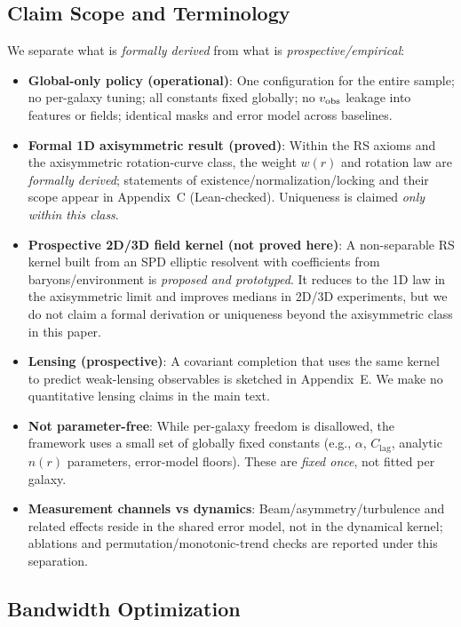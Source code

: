 \documentclass[fleqn,usenatbib]{mnras}
\begin{document}
\subsection*{Claim Scope and Terminology}
\noindent We separate what is \emph{formally derived} from what is \emph{prospective/empirical}:
\begin{itemize}
  \item \textbf{Global-only policy (operational)}: One configuration for the entire sample; no per-galaxy tuning; all constants fixed globally; no $v_{\rm obs}$ leakage into features or fields; identical masks and error model across baselines.
  \item \textbf{Formal 1D axisymmetric result (proved)}: Within the RS axioms and the axisymmetric rotation-curve class, the weight $w(r)$ and rotation law are \emph{formally derived}; statements of existence/normalization/locking and their scope appear in Appendix~C (Lean-checked). Uniqueness is claimed \emph{only within this class}.
  \item \textbf{Prospective 2D/3D field kernel (not proved here)}: A non-separable RS kernel built from an SPD elliptic resolvent with coefficients from baryons/environment is \emph{proposed and prototyped}. It reduces to the 1D law in the axisymmetric limit and improves medians in 2D/3D experiments, but we do not claim a formal derivation or uniqueness beyond the axisymmetric class in this paper.
  \item \textbf{Lensing (prospective)}: A covariant completion that uses the same kernel to predict weak-lensing observables is sketched in Appendix~E. We make no quantitative lensing claims in the main text.
  \item \textbf{Not parameter-free}: While per-galaxy freedom is disallowed, the framework uses a small set of globally fixed constants (e.g., $\alpha$, $C_\mathrm{lag}$, analytic $n(r)$ parameters, error-model floors). These are \emph{fixed once}, not fitted per galaxy.
  \item \textbf{Measurement channels vs dynamics}: Beam/asymmetry/turbulence and related effects reside in the shared error model, not in the dynamical kernel; ablations and permutation/monotonic-trend checks are reported under this separation.
\end{itemize}

\subsection{Bandwidth Optimization}
\end{document}
